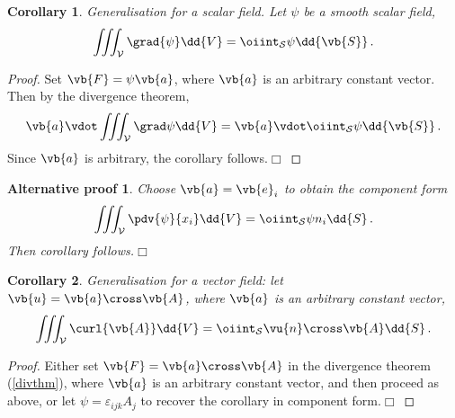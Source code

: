 \documentclass{article}
\theoremstyle{plain}\theoremheaderfont{\normalfont\itshape}\theorembodyfont{\rmfamily}\theoremseparator{.}\newtheorem*{rem}{Remark}\newtheorem*{ex}{Example}\newtheorem*{proof}{Proof}\newtheorem*{altp}{Alternative proof}
\theoremstyle{plain}\theoremheaderfont{\normalfont\bfseries}\theorembodyfont{\rmfamily}\theoremseparator{.}\newtheorem{thm}{Theorem}[section]\newtheorem{lem}[thm]{Lemma}\newtheorem{prop}[thm]{Proposition}\newtheorem*{cor}{Corollary}\newtheorem{defn}[thm]{Definition}\newtheorem{clm}[thm]{Claim}\newtheorem{clminproof}{Claim}
\theoremstyle{break}\theoremheaderfont{\normalfont\itshape}\theorembodyfont{\rmfamily}\theoremseparator{.\medskip}\newtheorem*{proofskip}{Proof}\newtheorem*{exs}{Examples}\newtheorem*{rems}{Remarks}
\theoremstyle{break}\theoremheaderfont{\normalfont\bfseries}\theorembodyfont{\rmfamily}\theoremseparator{.\medskip}\newtheorem{lemskip}[thm]{Lemma}\newtheorem{defnskip}[thm]{Definition}\newtheorem{propskip}[thm]{Proposition}\newtheorem{thmskip}[thm]{Theorem}
\numberwithin{equation}{section}
\newcommand{\qed}{\hfill\ensuremath{\Box}}
\begin{document}
	\begin{cor}
		Generalisation for a scalar field. Let \(\psi\) be a smooth scalar field,
		\[\iiint_{\mathcal{V}}\grad{\psi}\dd{V}=\oiint_{\mathcal{S}}\psi\dd{\vb{S}}\,.\]
	\end{cor}
	\begin{proof}
		Set \(\vb{F}=\psi\vb{a}\), where \(\vb{a}\) is an arbitrary constant vector. Then by the divergence theorem,
		\[\vb{a}\vdot\iiint_\mathcal{V}\grad\psi\dd{V}=\vb{a}\vdot\oiint_\mathcal{S}\psi\dd{\vb{S}}\,.\]
		Since \(\vb{a}\) is arbitrary, the corollary follows.\qed
	\end{proof}
	\begin{altp}
		Choose \(\vb{a}=\vb{e}_i\) to obtain the component form
		\[\iiint_\mathcal{V}\pdv{\psi}{x_i}\dd{V}=\oiint_\mathcal{S}\psi n_i\dd{S}\,.\]
		Then corollary follows.\qed
	\end{altp}
	\begin{cor}
		Generalisation for a vector field: let \(\vb{u}=\vb{a}\cross\vb{A}\), where \(\vb{a}\) is an arbitrary constant vector,
		\[\iiint_{\mathcal{V}}\curl{\vb{A}}\dd{V}=\oiint_{\mathcal{S}}\vu{n}\cross\vb{A}\dd{S}\,.\]
	\end{cor}
	\begin{proof}
		Either set \(\vb{F}=\vb{a}\cross\vb{A}\) in the divergence theorem (\cref{divthm}), where \(\vb{a}\) is an arbitrary constant vector, and then proceed as above, or let \(\psi=\varepsilon_{ijk}A_j\) to recover the corollary in component form.\qed
	\end{proof}
	
\end{document}
